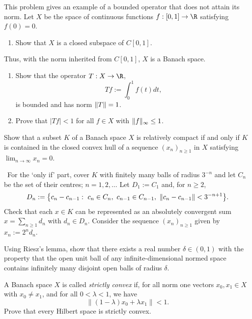 \begin{problem}
    This problem gives an example of a bounded operator that does not attain its norm.
 Let $X$ be the space of continuous functions $f:[0,1]\to \R$ satisfying $f(0)=0$.
\begin{enumerate}
  \item[(a)] Show that $X$ is a closed subspace of $C[0,1]$.
\end{enumerate}
Thus, with the norm inherited from $C[0,1]$, $X$ is a Banach space.
\begin{enumerate}
  \item [(b)]Show that the operator $T: X\to\R$,
  $$ Tf := \int_0^1 f(t) d t,$$
  is bounded  and has norm ${\|} T{\|} =1$.
  \item[(c)] Prove that $|Tf| <1$ for all $f\in X$ with ${\|} f{\|}_\infty \le 1$.
\end{enumerate}
\end{problem}

\begin{problem}
    Show that a subset $K$ of a Banach space $X$ is relatively compact if and only if $K$ is contained in the closed convex hull of a
sequence $(x_n)_{n\ge 1}$ in $X$ satisfying $\lim_{n\to \infty} x_n = 0$.

\ For the `only if' part, cover $K$ with finitely many
balls of radius $3^{-n}$ and let $C_n$ be the set of their centres; $n=1,2,\dots$
Let $D_1 := C_1$ and, for $n\ge 2$,
$$ D_n := \bigl\{c_n - c_{n-1}:\ c_n\in C_n, \ c_{n-1}\in C_{n-1}, \ \n c_n - c_{n-1}\n < 3^{-n+1}\bigr\}.$$
Check that each $x\in K$ can be represented as an absolutely convergent sum $x = \sum_{n\ge 1} d_n$
with $d_n\in D_n$. Consider the sequence $(x_n)_{n\ge 1}$ given by $x_n := 2^n d_n$.
\end{problem}

\begin{problem}
    Using Riesz's lemma, show that there exists a real number $\delta\in (0,1)$ with the property that the open unit ball of any infinite-dimensional normed space contains infinitely many disjoint open balls of radius $\delta$.
\end{problem}

\begin{problem}
    A Banach space \(X\) is called \emph{strictly convex} if, for all norm
one vectors \(x_0,x_1\in X\) with \(x_0\neq x_1\), and for all
\(0<\lambda<1\), we have
\[
\|(1-\lambda)x_0+\lambda x_1\|<1.
\]
Prove that every Hilbert space is strictly convex.
\end{problem}

